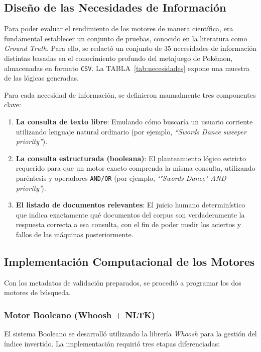 \documentclass[conference,a4paper]{IEEEtran}
\begin{document}
\subsection{Diseño de las Necesidades de Información}

Para poder evaluar el rendimiento de los motores de manera científica, era fundamental establecer un conjunto de pruebas, conocido en la literatura como \emph{Ground Truth}. Para ello, se redactó un conjunto de 35 necesidades de información distintas basadas en el conocimiento profundo del metajuego de Pokémon, almacenadas en formato \texttt{CSV}. La TABLA~\ref{tab:necesidades} expone una muestra de las lógicas generadas.

Para cada necesidad de información, se definieron manualmente tres componentes clave:
\begin{enumerate}
\item \textbf{La consulta de texto libre}: Emulando cómo buscaría un usuario corriente utilizando lenguaje natural ordinario (por ejemplo, \emph{``Swords Dance sweeper priority''}).
\item \textbf{La consulta estructurada (booleana)}: El planteamiento lógico estricto requerido para que un motor exacto comprenda la misma consulta, utilizando paréntesis y operadores \texttt{AND/OR} (por ejemplo, \emph{`"Swords Dance" AND priority'}).
\item \textbf{El listado de documentos relevantes}: El juicio humano determinístico que indica exactamente qué documentos del corpus son verdaderamente la respuesta correcta a esa consulta, con el fin de poder medir los aciertos y fallos de las máquinas posteriormente.
\end{enumerate}

\subsection{Implementación Computacional de los Motores}

Con los metadatos de validación preparados, se procedió a programar los dos motores de búsqueda.

\subsubsection{Motor Booleano (Whoosh + NLTK)}

El sistema Booleano se desarrolló utilizando la librería \emph{Whoosh} para la gestión del índice invertido. La implementación requirió tres etapas diferenciadas:
\end{document}

